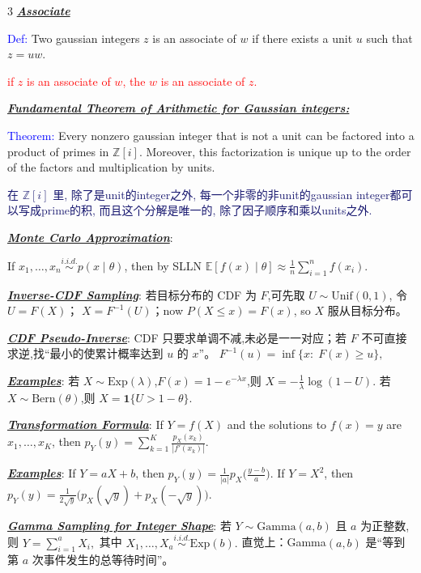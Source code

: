 \documentclass[12pt]{article}
\newcommand{\bulletPoint}[1]{\underline{\textit{\textbf{#1}}}}
\begin{document}
\begin{multicols*}{3}
\bulletPoint{Associate} 

\textcolor{blue}{Def:} Two gaussian integers $z$ is an associate of $w$  if there exists a unit $u$ such that $z=uw$. 

\textcolor{red}{if $z$ is an associate of $w$, the $w$ is an associate of $z$.}


\bulletPoint{Fundamental Theorem of Arithmetic for Gaussian integers:}

\textcolor{blue}{Theorem:} Every nonzero gaussian integer that is not a unit can be factored into a product of primes in $\mathbb{Z}[i]$. Moreover, this factorization is unique up to the order of the factors and multiplication by units.

{\fontsize{5.5pt}{5pt}\selectfont\textcolor{MidnightBlue}{在 $\mathbb{Z}[i]$ 里, 除了是unit的integer之外, 每一个非零的非unit的gaussian integer都可以写成prime的积, 而且这个分解是唯一的, 除了因子顺序和乘以units之外.}}



\bulletPoint{Monte Carlo Approximation}:

If $x_1,\dots,x_n \overset{i.i.d.}{\sim} p(x\mid \theta)$, then by SLLN
$\mathbb E[f(x)\mid \theta]\approx \frac{1}{n}\sum_{i=1}^n f(x_i).$

\bulletPoint{Inverse-CDF Sampling}:
若目标分布的 CDF 为 $F$,可先取 $U\sim \mathrm{Unif}(0,1)$,
令$U=F(X)$； $X=F^{-1}(U)$；now $P(X\le x)=F(x)$,
so $X$ 服从目标分布。

\bulletPoint{CDF Pseudo-Inverse}:
CDF 只要求单调不减,未必是一一对应；若 $F$ 不可直接求逆,找“最小的使累计概率达到 $u$ 的 $x$”。
$F^{-1}(u)=\inf\{x:\; F(x)\ge u\},$

\bulletPoint{Examples}:
若 $X\sim \mathrm{Exp}(\lambda)$,$F(x)=1-e^{-\lambda x}$,则
$X=-\frac{1}{\lambda}\log(1-U).$
若 $X\sim \mathrm{Bern}(\theta)$,则
$X=\mathbf 1\{U>1-\theta\}.$

\bulletPoint{Transformation Formula}:
If $Y=f(X)$ and the solutions to $f(x)=y$ are $x_1,\dots,x_K$, then
\textcolor{blue!50!black}{$\textstyle
p_Y(y)=\sum_{k=1}^K \frac{p_X(x_k)}{|f'(x_k)|}.
$}

\bulletPoint{Examples}:
If $Y=aX+b$, then
$p_Y(y)=\frac{1}{|a|}p_X\!\bigl(\frac{y-b}{a}\bigr).$
If $Y=X^2$, then
$p_Y(y)=\frac{1}{2\sqrt y}\bigl(p_X(\sqrt y)+p_X(-\sqrt y)\bigr).$

\bulletPoint{Gamma Sampling for Integer Shape}:
若 $Y\sim \mathrm{Gamma}(a,b)$ 且 $a$ 为正整数,则
$Y=\sum_{i=1}^a X_i,$ 其中 $X_1,\dots,X_a \overset{i.i.d.}{\sim} \mathrm{Exp}(b).$
直觉上：Gamma$(a,b)$ 是“等到第 $a$ 次事件发生的总等待时间”。


\end{multicols*}
\end{document}

